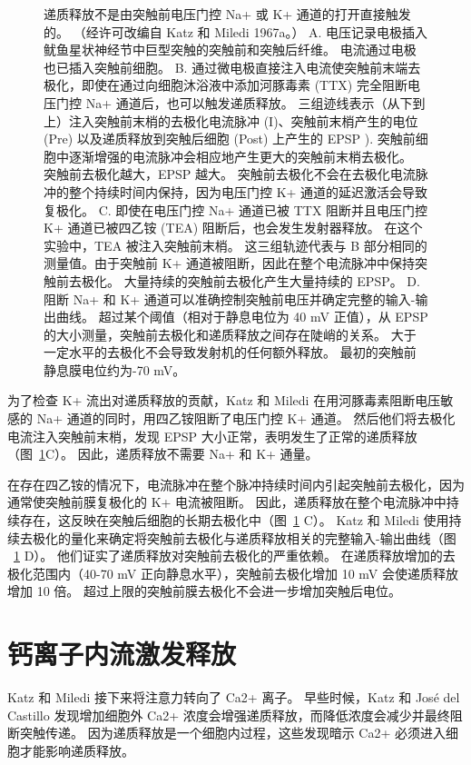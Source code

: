 \begin{figure}[htbp]
	\caption{递质释放不是由突触前电压门控 Na+ 或 K+ 通道的打开直接触发的。 （经许可改编自 Katz 和 Miledi 1967a。） A. 电压记录电极插入鱿鱼星状神经节中巨型突触的突触前和突触后纤维。 电流通过电极也已插入突触前细胞。 B. 通过微电极直接注入电流使突触前末端去极化，即使在通过向细胞沐浴液中添加河豚毒素 (TTX) 完全阻断电压门控 Na+ 通道后，也可以触发递质释放。 三组迹线表示（从下到上）注入突触前末梢的去极化电流脉冲 (I)、突触前末梢产生的电位 (Pre) 以及递质释放到突触后细胞 (Post) 上产生的 EPSP ). 突触前细胞中逐渐增强的电流脉冲会相应地产生更大的突触前末梢去极化。 突触前去极化越大，EPSP 越大。 突触前去极化不会在去极化电流脉冲的整个持续时间内保持，因为电压门控 K+ 通道的延迟激活会导致复极化。 C. 即使在电压门控 Na+ 通道已被 TTX 阻断并且电压门控 K+ 通道已被四乙铵 (TEA) 阻断后，也会发生发射器释放。 在这个实验中，TEA 被注入突触前末梢。 这三组轨迹代表与 B 部分相同的测量值。由于突触前 K+ 通道被阻断，因此在整个电流脉冲中保持突触前去极化。 大量持续的突触前去极化产生大量持续的 EPSP。 D. 阻断 Na+ 和 K+ 通道可以准确控制突触前电压并确定完整的输入-输出曲线。 超过某个阈值（相对于静息电位为 40 mV 正值），从 EPSP 的大小测量，突触前去极化和递质释放之间存在陡峭的关系。 大于一定水平的去极化不会导致发射机的任何额外释放。 最初的突触前静息膜电位约为-70 mV。}
	\label{fig:15_2}
\end{figure}


为了检查 K+ 流出对递质释放的贡献，Katz 和 Miledi 在用河豚毒素阻断电压敏感的 Na+ 通道的同时，用四乙铵阻断了电压门控 K+ 通道。
然后他们将去极化电流注入突触前末梢，发现 EPSP 大小正常，表明发生了正常的递质释放（图~\ref{fig:15_2}C）。
因此，递质释放不需要 Na+ 和 K+ 通量。


在存在四乙铵的情况下，电流脉冲在整个脉冲持续时间内引起突触前去极化，因为通常使突触前膜复极化的 K+ 电流被阻断。
因此，递质释放在整个电流脉冲中持续存在，这反映在突触后细胞的长期去极化中（图~\ref{fig:15_2} C）。
Katz 和 Miledi 使用持续去极化的量化来确定将突触前去极化与递质释放相关的完整输入-输出曲线（图 ~\ref{fig:15_2} D）。
他们证实了递质释放对突触前去极化的严重依赖。 在递质释放增加的去极化范围内（40-70 mV 正向静息水平），突触前去极化增加 10 mV 会使递质释放增加 10 倍。
超过上限的突触前膜去极化不会进一步增加突触后电位。



\section{钙离子内流激发释放}

Katz 和 Miledi 接下来将注意力转向了 Ca2+ 离子。
早些时候，Katz 和 José del Castillo 发现增加细胞外 Ca2+ 浓度会增强递质释放，而降低浓度会减少并最终阻断突触传递。
因为递质释放是一个细胞内过程，这些发现暗示 Ca2+ 必须进入细胞才能影响递质释放。


